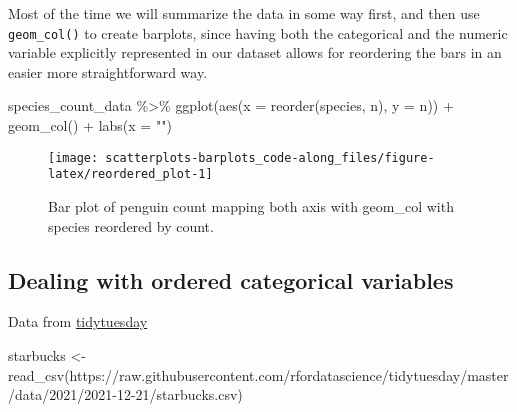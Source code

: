 \documentclass[
]{article}
\newenvironment{Shaded}{\begin{snugshade}}{\end{snugshade}}
\newcommand{\AttributeTok}[1]{\textcolor[rgb]{0.77,0.63,0.00}{#1}}
\newcommand{\FunctionTok}[1]{\textcolor[rgb]{0.00,0.00,0.00}{#1}}
\newcommand{\NormalTok}[1]{#1}
\newcommand{\OtherTok}[1]{\textcolor[rgb]{0.56,0.35,0.01}{#1}}
\newcommand{\SpecialCharTok}[1]{\textcolor[rgb]{0.00,0.00,0.00}{#1}}
\newcommand{\StringTok}[1]{\textcolor[rgb]{0.31,0.60,0.02}{#1}}
\begin{document}
Most of the time we will summarize the data in some way first, and then
use \texttt{geom\_col()} to create barplots, since having both the
categorical and the numeric variable explicitly represented in our
dataset allows for reordering the bars in an easier more straightforward
way.

\begin{Shaded}
\begin{Highlighting}[]
\NormalTok{species\_count\_data }\SpecialCharTok{\%\textgreater{}\%}
  \FunctionTok{ggplot}\NormalTok{(}\FunctionTok{aes}\NormalTok{(}\AttributeTok{x =} \FunctionTok{reorder}\NormalTok{(species, n), }
             \AttributeTok{y =}\NormalTok{ n)) }\SpecialCharTok{+}
  \FunctionTok{geom\_col}\NormalTok{() }\SpecialCharTok{+}
  \FunctionTok{labs}\NormalTok{(}\AttributeTok{x =} \StringTok{""}\NormalTok{)}
\end{Highlighting}
\end{Shaded}

\begin{figure}

{\centering \texttt{[image: scatterplots-barplots\_code-along\_files/figure-latex/reordered\_plot-1]} 

}

\caption{Bar plot of penguin count mapping both axis with geom_col with species reordered by count.}\label{fig:reordered_plot}
\end{figure}

\hypertarget{dealing-with-ordered-categorical-variables}{%
\subsection{Dealing with ordered categorical
variables}\label{dealing-with-ordered-categorical-variables}}

Data from
\href{https://github.com/rfordatascience/tidytuesday/blob/master/data/2021/2021-12-21/readme.md}{tidytuesday}

\begin{Shaded}
\begin{Highlighting}[]
\NormalTok{starbucks }\OtherTok{\textless{}{-}} \FunctionTok{read\_csv}\NormalTok{(}\StringTok{\textquotesingle{}https://raw.githubusercontent.com/rfordatascience/tidytuesday/master/data/2021/2021{-}12{-}21/starbucks.csv\textquotesingle{}}\NormalTok{)}
\end{Highlighting}
\end{Shaded}
\end{document}
